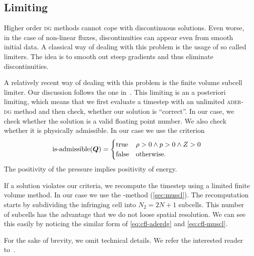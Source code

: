 \subsection{Limiting}\label{sec:limiting}
Higher order \textsc{dg} methods cannot cope with discontinuous solutions.
Even worse, in the case of non-linear fluxes, discontinuities can appear even from smooth initial data.
A classical way of dealing with this problem is the usage of so called limiters.
The idea is to smooth out steep gradients and thus eliminate discontinuities.

A relatively recent way of dealing with this problem is the finite volume subcell limiter.
Our discussion follows the one in~\cite{dumbser2016simple}.
This limiting is an a posteriori limiting, which means that we first evaluate a timestep with an unlimited \textsc{ader-dg} method and then check, whether our solution is \enquote{correct}.
In our case, we check whether the solution is a valid floating point number.
We also check whether it is physically admissible.
In our case we use the criterion
\begin{equation}
  \label{eq:limiting-physical}
  \operatorname{is-admissible}(\bm{Q}) =
  \begin{cases}
    \text{true} & \rho > 0 \land p > 0 \land Z > 0 \\
    \text{false} & \text{otherwise}.
  \end{cases}
\end{equation}
The positivity of the pressure implies positivity of energy.

If a solution violates our criteria, we recompute the timestep using a limited finite volume method.
In our case we use the \muscl{}-method (\cref{sec:muscl}).
The recomputation starts by subdividing the infringing cell into $N_2 = 2N + 1$ subcells.
This number of subcells has the advantage that we do not loose spatial resolution.
We can see this easily by noticing the similar form of \cref{eq:cfl-aderdg} and \cref{eq:cfl-muscl}.

For the sake of brevity, we omit technical details.
We refer the interested reader to~\cite{dumbser2016simple}.

